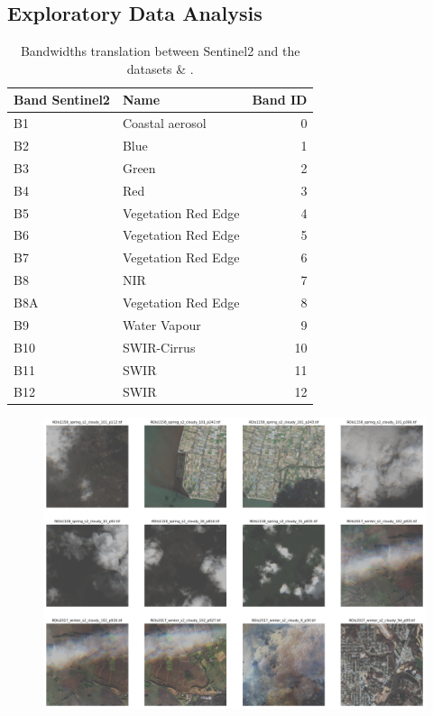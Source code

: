 \documentclass[../main.tex]{subfiles}
\begin{document}
\begin{appendices}
\section{Exploratory Data Analysis}
\begin{table}[H]
	\centering
	\caption{Bandwidths translation between Sentinel2 and the datasets \cite{sen12mscr} \& \cite{sen12mscrts}.}
	
	\begin{tabular}{llr}
		\hline
		Band Sentinel2 & Name                & Band ID \\ \hline
		B1             & Coastal aerosol     &       0 \\
		B2             & Blue                &       1 \\
		B3             & Green               &       2 \\
		B4             & Red                 &       3 \\
		B5             & Vegetation Red Edge &       4 \\
		B6             & Vegetation Red Edge &       5 \\
		B7             & Vegetation Red Edge &       6 \\
		B8             & NIR                 &       7 \\
		B8A            & Vegetation Red Edge &       8 \\
		B9             & Water Vapour        &       9 \\
		B10            & SWIR-Cirrus         &      10 \\
		B11            & SWIR                &      11 \\
		B12            & SWIR                &      12 \\ \hline
	\end{tabular}
	\label{tab:band-translation}
\end{table}
\begin{figure}[H]
	\centering
	\includegraphics[width=16cm]{imgs/eda/first-visualization}

\end{figure}
\end{appendices}
\end{document}
